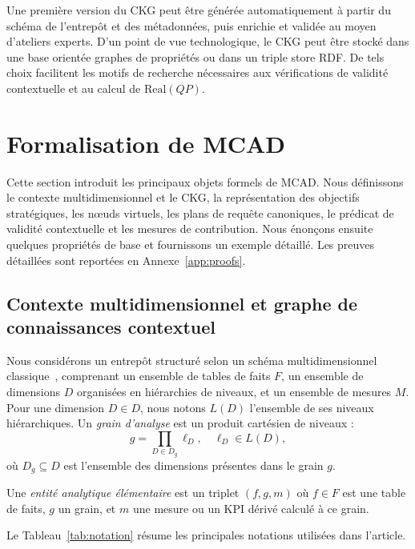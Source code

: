 \documentclass[journal]{IEEEtran}
\begin{document}
Une première version du CKG peut être générée automatiquement à partir du schéma de l'entrepôt et des métadonnées, puis enrichie et validée au moyen d'ateliers experts. D'un point de vue technologique, le CKG peut être stocké dans une base orientée graphes de propriétés ou dans un triple store RDF. De tels choix facilitent les motifs de recherche nécessaires aux vérifications de validité contextuelle et au calcul de $\mathrm{Real}(QP)$.

\section{Formalisation de MCAD}
\label{sec:formal}

Cette section introduit les principaux objets formels de MCAD. Nous définissons le contexte multidimensionnel et le CKG, la représentation des objectifs stratégiques, les nœuds virtuels, les plans de requête canoniques, le prédicat de validité contextuelle et les mesures de contribution. Nous énonçons ensuite quelques propriétés de base et fournissons un exemple détaillé. Les preuves détaillées sont reportées en Annexe~\ref{app:proofs}.

\subsection{Contexte multidimensionnel et graphe de connaissances contextuel}

Nous considérons un entrepôt structuré selon un schéma multidimensionnel classique~\cite{ChaudhuriDayal97,KimballRoss2013}, comprenant un ensemble de tables de faits $F$, un ensemble de dimensions $D$ organisées en hiérarchies de niveaux, et un ensemble de mesures $M$. Pour une dimension $D\in D$, nous notons $L(D)$ l'ensemble de ses niveaux hiérarchiques. Un \emph{grain d'analyse} est un produit cartésien de niveaux :
\[
g = \prod_{D\in D_g} \ell_D,\quad \ell_D\in L(D),
\]
où $D_g\subseteq D$ est l'ensemble des dimensions présentes dans le grain $g$.

Une \emph{entité analytique élémentaire} est un triplet $(f,g,m)$ où $f\in F$ est une table de faits, $g$ un grain, et $m$ une mesure ou un KPI dérivé calculé à ce grain.

Le Tableau~\ref{tab:notation} résume les principales notations utilisées dans l'article.
\end{document}
